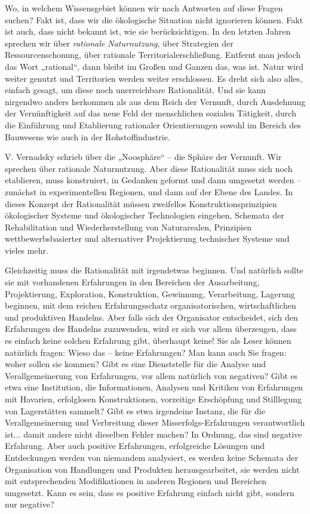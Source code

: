 \documentclass[11pt,a4paper]{article}
\begin{document}
Wo, in welchem Wissensgebiet können wir nach Antworten auf diese Fragen
suchen? Fakt ist, dass wir die ökologische Situation nicht ignorieren können.
Fakt ist auch, dass nicht bekannt ist, wie sie berücksichtigen. In den letzten
Jahren sprechen wir über \emph{rationale Naturnutzung}, über Strategien der
Ressourcenschonung, über rationale Territorialerschließung. Entfernt man
jedoch das Wort „rational“, dann bleibt im Großen und Ganzen das, was ist.
Natur wird weiter genutzt und Territorien werden weiter erschlossen. Es dreht
sich also alles, einfach gesagt, um diese noch unerreichbare Rationalität.
Und sie kann nirgendwo anders herkommen als aus dem Reich der Vernunft, durch
Ausdehnung der Vernünftigkeit auf das neue Feld der menschlichen sozialen
Tätigkeit, durch die Einführung und Etablierung rationaler Orientierungen
sowohl im Bereich des Bauwesens wie auch in der Rohstoff\-industrie.

V. Vernadsky schrieb über die „Noosphäre“ -- die Sphäre der Vernunft. Wir
sprechen über rationale Naturnutzung. Aber diese Rationalität muss sich noch
etablieren, muss konstruiert, in Gedanken geformt und dann umgesetzt werden --
zunächst in experimentellen Regionen, und dann auf der Ebene des Landes.  In
dieses Konzept der Rationalität müssen zweifellos Konstruktionsprinzipien
ökologischer Systeme und ökologischer Technologien eingehen, Schemata der
Rehabilitation und Wiederherstellung von Naturarealen, Prinzipien
wettbewerbsbasierter und alternativer Projektierung technischer Systeme und
vieles mehr.

Gleichzeitig muss die Rationalität mit irgendetwas beginnen. Und natürlich
sollte sie mit vorhandenen Erfahrungen in den Bereichen der Ausarbeitung,
Projektierung, Exploration, Konstruktion, Gewinnung, Verarbeitung, Lagerung
beginnen, mit dem reichen Erfahrungsschatz organisatorischen, wirtschaftlichen
und produktiven Handelns. Aber falls sich der Organisator entscheidet, sich
den Erfahrungen des Handelns zuzuwenden, wird er sich vor allem überzeugen,
dass es einfach keine solchen Erfahrung gibt, überhaupt keine! Sie als Leser
können natürlich fragen: Wieso das -- keine Erfahrungen? Man kann auch Sie
fragen: woher sollen sie kommen?  Gibt es eine Dienststelle für die Analyse
und Verallgemeinerung von Erfahrungen, vor allem natürlich von negativen?
Gibt es etwa eine Institution, die Informationen, Analysen und Kritiken von
Erfahrungen mit Havarien, erfolglosen Konstruktionen, vorzeitige Erschöpfung
und Still\-legung von Lagerstätten sammelt? Gibt es etwa irgendeine Instanz,
die für die Verallgemeinerung und Verbreitung dieser Misserfolgs-Erfahrungen
verantwortlich ist... damit andere nicht dieselben Fehler machen? In Ordnung,
das sind negative Erfahrung. Aber auch positive Erfahrungen, erfolgreiche
Lösungen und Entdeckungen werden von niemandem analysiert, es werden keine
Schemata der Organisation von Handlungen und Produkten herausgearbeitet, sie
werden nicht mit entsprechenden Modifikationen in anderen Regionen und
Bereichen umgesetzt. Kann es sein, dass es positive Erfahrung einfach nicht
gibt, sondern nur negative?
\end{document}
